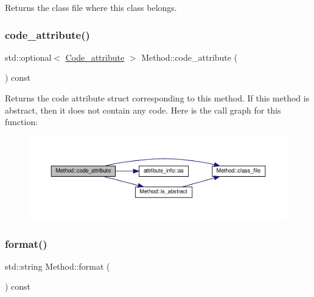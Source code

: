 Returns the class file where this class belongs. 

\mbox{\label{classMethod_af92b40aa1a81df3a6827d688adc005bf}} 
\subsubsection{\texorpdfstring{code\+\_\+attribute()}{code\_attribute()}}
{\footnotesize\ttfamily std\+::optional$<$ \hyperlink{structCode__attribute}{Code\+\_\+attribute} $>$ Method\+::code\+\_\+attribute (\begin{DoxyParamCaption}{ }\end{DoxyParamCaption}) const}

Returns the code attribute struct corresponding to this method. If this method is abstract, then it does not contain any code. Here is the call graph for this function\+:
\nopagebreak
\begin{figure}[H]
\begin{center}
\leavevmode
\includegraphics[width=350pt]{classMethod_af92b40aa1a81df3a6827d688adc005bf_cgraph}
\end{center}
\end{figure}
\mbox{\label{classMethod_a3f6d55a368a1e2727bea0799c3cdc0f6}} 
\subsubsection{\texorpdfstring{format()}{format()}}
{\footnotesize\ttfamily std\+::string Method\+::format (\begin{DoxyParamCaption}{ }\end{DoxyParamCaption}) const}

